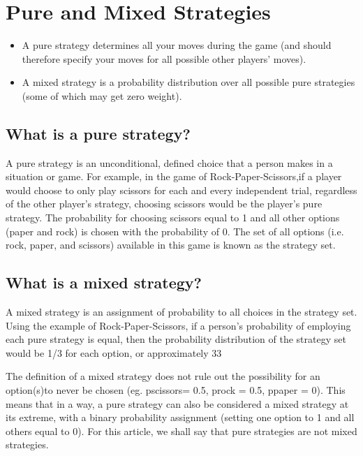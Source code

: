 \documentclass[]{report}
\begin{document}
\section{Pure and Mixed Strategies}


\begin{itemize}
\item A pure strategy determines all your moves during the game (and should therefore specify your moves for all possible other players' moves). 
\item A mixed strategy is a probability distribution over all possible pure strategies (some of which may get zero weight).
\end{itemize}



\subsection{What is a pure strategy?}

A pure strategy is an unconditional, defined choice that a person makes in a situation or game. For example, in the game of Rock-Paper-Scissors,if a player would choose to only play scissors for each and every independent trial, regardless of the other player’s strategy, choosing scissors would be the player’s pure strategy. The probability for choosing scissors equal to 1 and all other options (paper and rock) is chosen with the probability of 0. The set of all options (i.e. rock, paper, and scissors) available in this game is known as the strategy set.


\subsection{What is a mixed strategy?}

A mixed strategy is an assignment of probability to all choices in the strategy set. Using the example of Rock-Paper-Scissors, if a person’s probability of employing each pure strategy is equal, then the probability distribution of the strategy set would be 1/3 for each option, or approximately 33%

The definition of a mixed strategy does not rule out the possibility for an option(s)to never be chosen (eg. pscissors= 0.5, prock = 0.5, ppaper = 0). This means that in a way, a pure strategy can also be considered a mixed strategy at its extreme, with a binary probability assignment (setting one option to 1 and all others equal to 0). For this article, we shall say that pure strategies are not mixed strategies.
\end{document}
